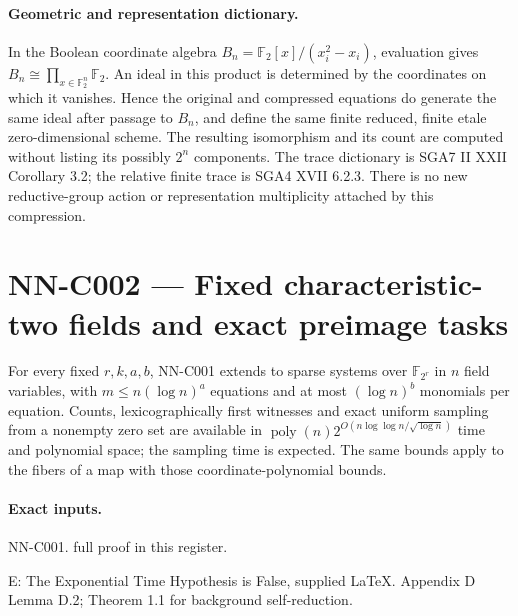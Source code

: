 \paragraph{Geometric and representation dictionary.}
In the Boolean coordinate algebra $B_n=\mathbb F_2[x]/(x_i^2-x_i)$, evaluation gives $B_n\cong\prod_{x\in\mathbb F_2^n}\mathbb F_2$. An ideal in this product is determined by the coordinates on which it vanishes. Hence the original and compressed equations do generate the same ideal after passage to $B_n$, and define the same finite reduced, finite etale zero-dimensional scheme. The resulting isomorphism and its count are computed without listing its possibly $2^n$ components. The trace dictionary is SGA7 II XXII Corollary 3.2; the relative finite trace is SGA4 XVII 6.2.3. There is no new reductive-group action or representation multiplicity attached by this compression.



\section{NN-C002 --- Fixed characteristic-two fields and exact preimage tasks}
\begin{proposition}[NN-C002]
For every fixed $r,k,a,b$, NN-C001 extends to sparse systems over $\mathbb F_{2^r}$ in $n$ field variables, with $m\leq n(\log n)^a$ equations and at most $(\log n)^b$ monomials per equation. Counts, lexicographically first witnesses and exact uniform sampling from a nonempty zero set are available in $\operatorname{poly}(n)2^{O(n\log\log n/\sqrt{\log n})}$ time and polynomial space; the sampling time is expected. The same bounds apply to the fibers of a map with those coordinate-polynomial bounds.
\end{proposition}
\paragraph{Exact inputs.}
NN-C001. full proof in this register.

E: The Exponential Time Hypothesis is False, supplied LaTeX. Appendix D Lemma D.2; Theorem 1.1 for background self-reduction.

